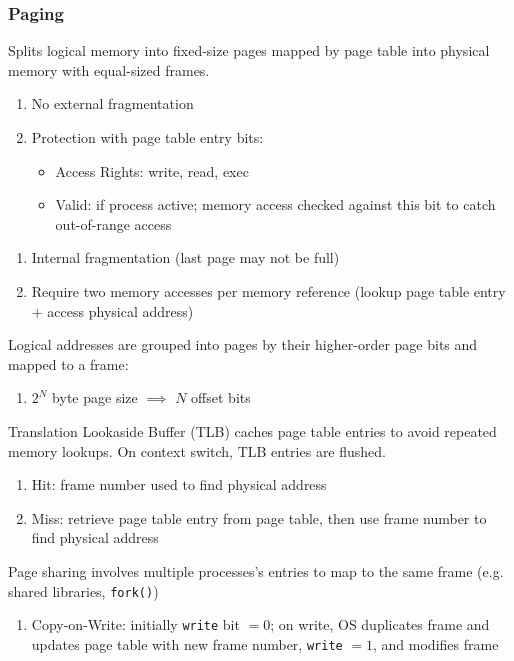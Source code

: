 \documentclass[12pt, a4paper]{article}
\begin{document}
\begin{multicols*}{3}
\subsubsection{Paging}
Splits logical memory into fixed-size pages mapped by page table into physical memory with equal-sized frames.
\begin{enumerate}[$+$]
  \item No external fragmentation
  \item Protection with page table entry bits:
    \vspace{2pt}
    \begin{itemize}[leftmargin=*]
      \item Access Rights: write, read, exec
      \item Valid: if process active; memory access checked against this bit to catch out-of-range access 
    \end{itemize}
\end{enumerate}\vspace{-1pt}
\begin{enumerate}[$-$]
  \item Internal fragmentation (last page may not be full)
  \item Require two memory accesses per memory reference (lookup page table entry $+$ access physical address) 
\end{enumerate}

Logical addresses are grouped into pages by their higher-order page bits and mapped to a frame:
\begin{enumerate}[\roman*.]
  \item $2^N$ byte page size $\implies$ $N$ offset bits
\end{enumerate}
{\centering{}\par}

Translation Lookaside Buffer (TLB) caches page table entries to avoid repeated memory lookups. On context switch, TLB entries are flushed.
\begin{enumerate}[\roman*.]
  \item Hit: frame number used to find physical address
  \item Miss: retrieve page table entry from page table, then use frame number to find physical address
\end{enumerate}

Page sharing involves multiple processes's entries to map to the same frame (e.g. shared libraries, \lstinline|fork()|)
\begin{enumerate}[\roman*.]
  \item Copy-on-Write: initially \lstinline|write| bit $= 0$; on write, OS duplicates frame and updates page table with new frame number, \lstinline|write| $= 1$, and modifies frame
\end{enumerate}
\vspace{-1em}
\colbreak

\end{multicols*}
\end{document}

